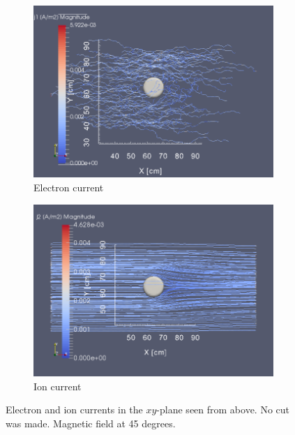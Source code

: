 \documentclass[twoside]{article}
\begin{document}
\begin{figure}[H]
\centering
\begin{subfigure}{.5\textwidth}
  \centering
  \includegraphics[width=\linewidth]{zoom_png/j1_zoom.png}
  \caption{Electron current}
  \label{fig:sub111}
\end{subfigure}%
\begin{subfigure}{.5\textwidth}
  \centering
  \includegraphics[width=\linewidth]{zoom_png/j2_zoom.png}
  \caption{Ion current}
  \label{fig:sub112}
\end{subfigure}
\caption{Electron and ion currents in the $xy$-plane seen from above. No cut was made. Magnetic field at 45 degrees.}
\label{fig:11}
\end{figure}
\end{document}
